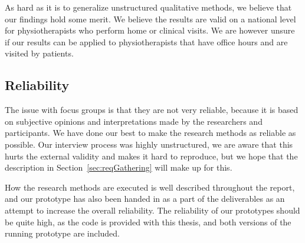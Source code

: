 As hard as it is to generalize unstructured qualitative methods, we believe that our findings hold some merit. We believe the results are valid on a national level for physiotherapists who perform home or clinical visits. We are however unsure if our results can be applied to physiotherapists that have office hours and are visited by patients.

\subsection{Reliability}
The issue with focus groups is that they are not very reliable, because it is based on subjective opinions and interpretations made by the researchers and participants. We have done our best to make the research methods as reliable as possible. Our interview process was highly unstructured, we are aware that this hurts the external validity and makes it hard to reproduce, but we hope that the description in Section~\ref{sec:reqGathering} will make up for this. 

How the research methods are executed is well described throughout the report, and our prototype has also been handed in as a part of the deliverables as an attempt to increase the overall reliability. The reliability of our prototypes should be quite high, as the code is provided with this thesis, and both versions of the running prototype are included.
